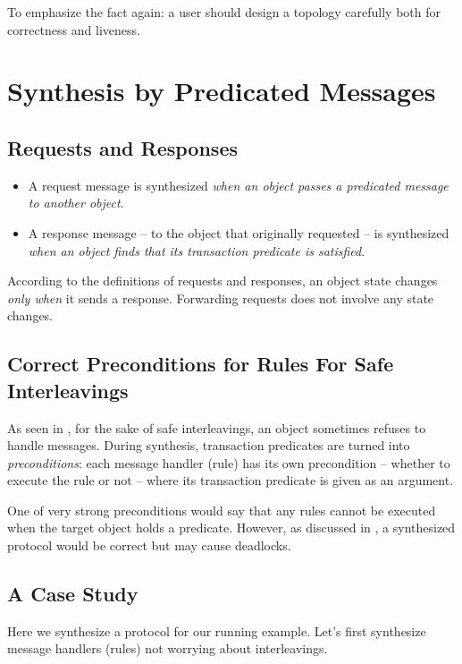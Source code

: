 \documentclass[format=manuscript]{acmart}
\begin{document}
To emphasize the fact again: a user should design a topology carefully both for
correctness and liveness.

\section{Synthesis by Predicated Messages}

\subsection{Requests and Responses}

\begin{itemize}
\item A request message is synthesized \emph{when an object passes a predicated
  message to another object}.
\item A response message -- to the object that originally requested -- is
  synthesized \emph{when an object finds that its transaction predicate is
    satisfied}.
\end{itemize}

According to the definitions of requests and responses, an object state changes
\emph{only when} it sends a response. Forwarding requests does not involve any
state changes.

\subsection{Correct Preconditions for Rules For Safe Interleavings}

As seen in , for the sake of safe interleavings, an object
sometimes refuses to handle messages. During synthesis, transaction predicates
are turned into \emph{preconditions}: each message handler (rule) has its own
precondition -- whether to execute the rule or not -- where its transaction
predicate is given as an argument.

One of very strong preconditions would say that any rules cannot be executed
when the target object holds a predicate. However, as discussed in
, a synthesized protocol would be correct but may cause
deadlocks.

\subsection{A Case Study}

Here we synthesize a protocol for our running example. Let's first synthesize
message handlers (rules) not worrying about interleavings.
\end{document}
